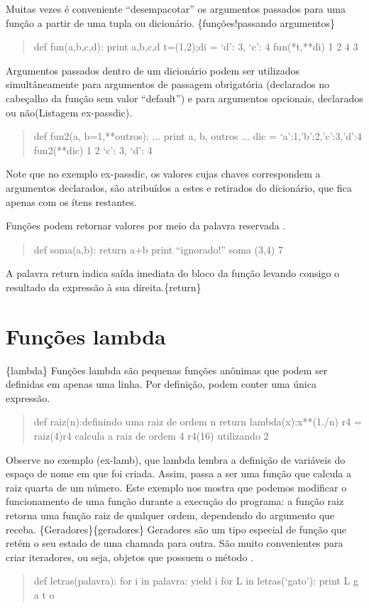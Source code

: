 \documentclass[a4paper,10pt,brazil]{sphinxmanual}
\begin{document}
Muitas vezes é conveniente ``desempacotar'' os argumentos passados
para uma função a partir de uma tupla ou dicionário.
\{funções!passando argumentos\}
\begin{quote}

def fun(a,b,c,d): print a,b,c,d t=(1,2);di = `d': 3, `c': 4
fun(*t,**di) 1 2 4 3
\end{quote}

Argumentos passados dentro de um dicionário podem ser utilizados
simultâneamente para argumentos de passagem obrigatória (declarados
no cabeçalho da função sem valor ``default'') e para argumentos
opcionais, declarados ou não(Listagem ex-passdic).
\begin{quote}

def fun2(a, b=1,**outros): ... print a, b, outros ... dic =
`a':1,'b':2,'c':3,'d':4 fun2(**dic) 1 2 `c': 3, `d': 4
\end{quote}

Note que no exemplo ex-passdic, os valores cujas chaves
correspondem a argumentos declarados, são atribuídos a estes e
retirados do dicionário, que fica apenas com os ítens restantes.

Funções podem retornar valores por meio da palavra reservada
.
\begin{quote}

def soma(a,b): return a+b print ``ignorado!'' soma (3,4) 7
\end{quote}

A palavra return indica saída imediata do bloco da função levando
consigo o resultado da expressão à sua direita.\{return\}


\section{Funções lambda}
\label{Cap2:funcoes-lambda}
\{lambda\} Funções lambda são pequenas funções anônimas que podem ser
definidas em apenas uma linha. Por definição, podem conter uma
única expressão.
\begin{quote}

def raiz(n):definindo uma raiz de ordem n return
lambda(x):x**(1./n) r4 = raiz(4)r4 calcula a raiz de ordem 4
r4(16) utilizando 2
\end{quote}

Observe no exemplo (ex-lamb), que lambda lembra a definição de
variáveis do espaço de nome em que foi criada. Assim,  passa
a ser uma função que calcula a raiz quarta de um número. Este
exemplo nos mostra que podemos modificar o funcionamento de uma
função durante a execução do programa: a função raiz retorna uma
função raiz de qualquer ordem, dependendo do argumento que receba.
\{Geradores\}\{geradores\} Geradores são um tipo especial de função que
retém o seu estado de uma chamada para outra. São muito
convenientes para criar iteradores, ou seja, objetos que possuem o
método .
\begin{quote}

def letras(palavra): for i in palavra: yield i for L in
letras(`gato'): print L g a t o
\end{quote}
\end{document}
